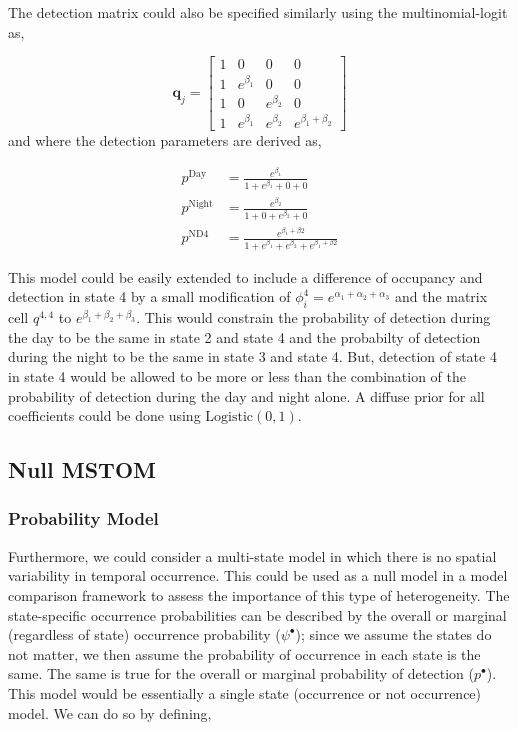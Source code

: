 \documentclass[12pt]{article}
\begin{document}
The detection matrix could also be specified similarly using the multinomial-logit as,

\begin{equation}
\boldsymbol{q}_{j} = \begin{bmatrix} 1 & 0 & 0 & 0 \\ 
									1 & e^{\beta_{1}} & 0 & 0 \\ 
									1 & 0 & e^{\beta_{2}} & 0\\
  								      1 & e^{\beta_{1}} & e^{\beta_{2}} & e^{\beta_{1}+\beta_{2}}  
  								      \end{bmatrix}
\end{equation}
and where the detection parameters are derived as,
\begin{center}
\begin{align*}
p^{\text{Day}} &= \frac{e^{\beta_{1}}}{1+e^{\beta_{1}}+0+0}\\
p^{\text{Night}} &= \frac{e^{\beta_{2}}}{1+0+e^{\beta_{2}}+0}\\
 p^{\text{ND4}} &= \frac{e^{\beta_{1}+\beta{2}}}{1+e^{\beta_{1}}+e^{\beta_{2}}+e^{\beta_{1}+\beta{2}}}
\end{align*}
\end{center}

This model could be easily extended to include a difference of occupancy and detection in state 4 by a small modification of $\phi^4_{i} = e^{\alpha_{1}+\alpha_{2}+\alpha_{3}}$ and the matrix cell $q^{4,4}$ to $e^{\beta_{1}+\beta_{2}+\beta_{3}} $. This would constrain the probability of detection during the day to be the same in state 2 and state 4 and the probabilty of detection during the night to be the same in state 3 and state 4. But, detection of state 4 in state 4 would be allowed to be more or less than the combination of the probability of detection during the day and night alone.  A diffuse prior for all coefficients could be done using $\text{Logistic}(0,1).$ \\

\subsection{Null MSTOM}
\subsubsection{Probability Model}
Furthermore, we could consider a multi-state model in which there is no spatial variability in temporal occurrence. This could be used as a null model in a model comparison framework to assess the importance of this type of heterogeneity. The state-specific occurrence probabilities can be described by the overall or marginal (regardless of state) occurrence probability ($\psi^{\bullet}$); since we assume the states do not matter, we then assume the probability of occurrence in each state is the same. The same is true for the overall or marginal probability of detection ($p^{\bullet}$). This model would be essentially a single state (occurrence or not occurrence) model. We can do so by defining, 
\end{document}
